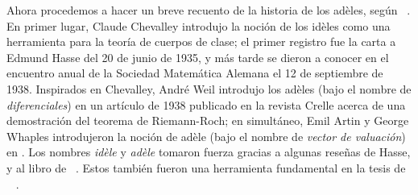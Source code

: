 \documentclass[teoria-numeros.tex]{subfiles}
\begin{document}
Ahora procedemos a hacer un breve recuento de la historia de los adèles, según \citeauthor{roquette:riemann}~\cite[191\psq]{roquette:riemann}.
En primer lugar, Claude Chevalley introdujo la noción de los idèles como una herramienta para la teoría de cuerpos de clase;
el primer registro fue la carta a Edmund Hasse del 20 de junio de 1935, y más tarde se dieron a conocer en el encuentro anual de la Sociedad Matemática Alemana
el 12 de septiembre de 1938.
Inspirados en Chevalley, André Weil introdujo los adèles (bajo el nombre de \textit{diferenciales}) en un artículo de 1938 publicado en la revista Crelle
acerca de una demostración del teorema de Riemann-Roch;
en simultáneo, Emil Artin y George Whaples introdujeron la noción de adèle (bajo el nombre de \textit{vector de valuación}) en \cite{artin:prod_form}.
Los nombres \textit{idèle} y \textit{adèle} tomaron fuerza gracias a algunas reseñas de Hasse, y al libro de \citeauthor{weil:basic}~\cite{weil:basic}.
Estos también fueron una herramienta fundamental en la tesis de \citeauthor{tate67fourier}~\cite{tate67fourier} \citeyear{tate67fourier}.

\printbibliography[segment=\therefsegment, check=onlynew, notcategory=history, notcategory=historical, notcategory=other]
\bibbycategory[segment=\therefsegment, check=onlynew]
\end{document}
